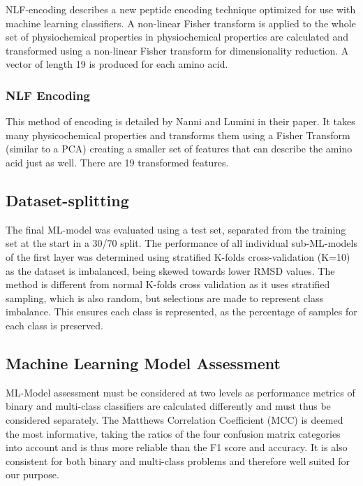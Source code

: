 \documentclass[12pt]{article}
\let\shortcite\cite
\begin{document}
NLF-encoding \shortcite{Nanni2011} describes a new peptide encoding technique optimized for use with machine learning classifiers. A non-linear Fisher transform is applied to the whole set of physiochemical properties in \shortcite{Kawashima2000}
physiochemical properties are calculated and transformed using a
non-linear Fisher transform for dimensionality reduction.  A vector of
length 19 is produced for each amino acid.



\subsubsection{NLF Encoding}
This method of encoding is detailed by Nanni and Lumini in their paper. It takes many physicochemical properties and transforms them using a Fisher Transform (similar to a PCA) creating a smaller set of features that can describe the amino acid just as well. There are 19 transformed features. 

\subsection{Dataset-splitting}
The final ML-model was evaluated using a test set, separated from the
training set at the start in a 30/70 split. The performance of all individual sub-ML-models of the first layer was determined using stratified K-folds cross-validation (K=10) as the
dataset is imbalanced, being skewed towards lower RMSD values\cite{Krstajic2014,Kohavi1995}. The
method is different from normal K-folds cross validation as it uses
stratified sampling, which is also random, but selections are made to represent class imbalance.
This ensures each class is represented, as the percentage of samples for each class is
preserved.

\subsection{Machine Learning Model Assessment} 
ML-Model assessment must be considered at two levels as performance
metrics of binary and multi-class classifiers are calculated
differently and must thus be considered separately. The Matthews
Correlation Coefficient (MCC)\cite{Chicco2020} is deemed the most
informative, taking the ratios of the four confusion matrix categories
into account and is thus more reliable than the F1 score and
accuracy. It is also consistent for both binary and multi-class
problems and therefore well suited for our purpose.\cite{Jurman2012}
 
\end{document}
